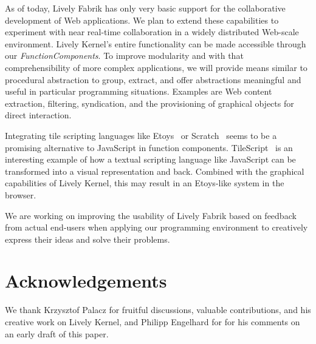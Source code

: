 \documentclass[pdftex, times, 10pt, twocolumn]{article}
\begin{document}
As of today, Lively Fabrik has only very basic support for the collaborative development of Web applications. We plan to extend these capabilities to experiment with near real-time collaboration in a widely distributed Web-scale environment. Lively Kernel's entire functionality can be made accessible through our {\em FunctionComponents}. To improve modularity and with that comprehensibility of more complex applications, we will provide means similar to procedural abstraction to group, extract, and offer abstractions meaningful and useful in particular programming situations. Examples are Web content extraction, filtering, syndication, and the provisioning of graphical objects for direct interaction. 

Integrating tile scripting languages like Etoys~\cite{Kay2005SEA} or Scratch~\cite{Maloney2004SSP} seems to be a promising alternative to JavaScript in function components. TileScript~\cite{Warth2008TMS} is an interesting example of how a textual scripting language like JavaScript can be transformed into a visual representation and back. Combined with the graphical capabilities of Lively Kernel, this may result in an Etoys-like system in the browser. 

We are working on improving the usability of Lively Fabrik based on feedback from actual end-users when applying our programming environment to creatively express their ideas and solve their problems. 



\section{Acknowledgements}
We thank Krzysztof Palacz for fruitful discussions, valuable contributions, and his creative work on Lively Kernel, and Philipp Engelhard for for his comments on an early draft of this paper.  

 



 
\end{document}

